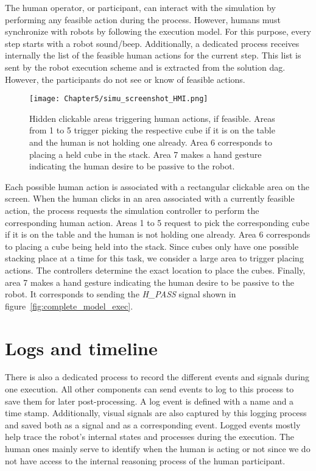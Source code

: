 The human operator, or participant, can interact with the simulation by performing any feasible action during the process. However, humans must synchronize with robots by following the execution model. For this purpose, every step starts with a robot sound/beep. Additionally, a dedicated process receives internally the list of the feasible human actions for the current step. This list is sent by the robot execution scheme and is extracted from the solution \acrshort{dag}. However, the participants do not see or know of feasible actions.

\begin{figure}[h]
    \centering
    \texttt{[image: Chapter5/simu\_screenshot\_HMI.png]}
    \caption{Hidden clickable areas triggering human actions, if feasible. Areas from 1 to 5 trigger picking the respective cube if it is on the table and the human is not holding one already. Area 6 corresponds to placing a held cube in the stack. Area 7 makes a hand gesture indicating the human desire to be passive to the robot.}
    \label{fig:hmi}
\end{figure}

Each possible human action is associated with a rectangular clickable area on the screen. When the human clicks in an area associated with a currently feasible action, the process requests the simulation controller to perform the corresponding human action. Areas 1 to 5 request to pick the corresponding cube if it is on the table and the human is not holding one already. Area 6 corresponds to placing a cube being held into the stack. Since cubes only have one possible stacking place at a time for this task, we consider a large area to trigger placing actions. The controllers determine the exact location to place the cubes. Finally, area 7 makes a hand gesture indicating the human desire to be passive to the robot. It corresponds to sending the \textit{H\_PASS} signal shown in figure~\ref{fig:complete_model_exec}.

\section{Logs and timeline}

There is also a dedicated process to record the different events and signals during one execution. All other components can send events to log to this process to save them for later post-processing. A log event is defined with a name and a time stamp. Additionally, visual signals are also captured by this logging process and saved both as a signal and as a corresponding event. Logged events mostly help trace the robot's internal states and processes during the execution. The human ones mainly serve to identify when the human is acting or not since we do not have access to the internal reasoning process of the human participant. 

